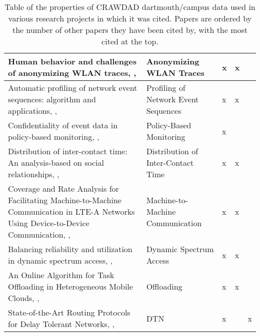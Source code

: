 \begin{table}
\begin{tabular}{|p{5.5cm}|p{2cm}|p{1.7cm}|p{1.7cm}|p{1.7cm}|}
Human behavior and challenges of anonymizing WLAN traces, \citeauthor{Kumar2009}, \citeyear{Kumar2009}         & Anonymizing WLAN Traces            & x                          & x                     &                            \\ \hline
Automatic profiling of network event sequences: algorithm and applications, \citeauthor{Meng2008}, \citeyear{Meng2008}           &Profiling of Network Event Sequences& x                          & x                     &                            \\ \hline
Confidentiality of event data in policy-based monitoring, \citeauthor{Montanari2012}, \citeyear{Montanari2012} & Policy-Based Monitoring            & x                          &                       &                            \\ \hline
Distribution of inter-contact time: An analysis-based on social relationships, \citeauthor{Wei2013}, \citeyear{Wei2013}             & Distribution of Inter-Contact Time & x                          & x                     &                            \\ \hline
Coverage and Rate Analysis for Facilitating Machine-to-Machine Communication in LTE-A Networks Using Device-to-Device Communication, \citeauthor{Swain2017}, \citeyear{Swain2017}         & Machine-to-Machine Communication   & x                          & x                     &                            \\ \hline
Balancing reliability and utilization in dynamic spectrum access, \citeauthor{Cao2012}, \citeyear{Cao2012}             & Dynamic Spectrum Access            & x                          & x                     &                            \\ \hline
An Online Algorithm for Task Offloading in Heterogeneous Mobile Clouds, \citeauthor{Zhou2018}, \citeyear{Zhou2018}           & Offloading                         & x                          & x                     &                            \\ \hline
State-of-the-Art Routing Protocols for Delay Tolerant Networks, \citeauthor{Feng2012}, \citeyear{Feng2012}          & DTN                                 & x                          &                       & x                          \\ \hline

\end{tabular}
\caption{Table of the properties of CRAWDAD dartmouth/campus data used in various research projects in which it was cited. Papers are ordered by the number of other papers they have been cited by, with the most cited at the top.}
\label{usageTable}
\end{table}